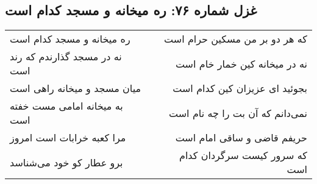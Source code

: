 \begin{center}
\section*{غزل شماره ۷۶: ره میخانه و مسجد کدام است}
\label{sec:076}
\begin{longtable}{l p{0.5cm} r}
ره میخانه و مسجد کدام است
&&
که هر دو بر من مسکین حرام است
\\
نه در مسجد گذارندم که رند است
&&
نه در میخانه کین خمار خام است
\\
میان مسجد و میخانه راهی است
&&
بجوئید ای عزیزان کین کدام است
\\
به میخانه امامی مست خفته است
&&
نمی‌دانم که آن بت را چه نام است
\\
مرا کعبه خرابات است امروز
&&
حریفم قاضی و ساقی امام است
\\
برو عطار کو خود می‌شناسد
&&
که سرور کیست سرگردان کدام است
\\
\end{longtable}
\end{center}
